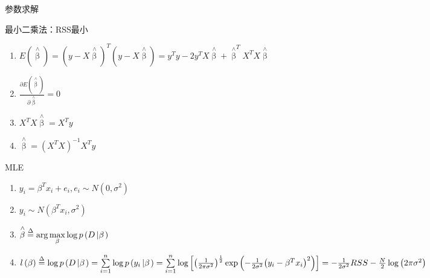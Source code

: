 \documentclass[xetex,mathserif,serif]{beamer}
\begin{document}
\begin{frame}{参数求解}
\begin{block}{最小二乘法：RSS最小}
\begin{enumerate}
  \item $E(\mathop \beta \limits^ \wedge) = {\left( {y  - X\mathop \beta \limits^ \wedge  } \right)^T}\left( {y  - X\mathop \beta \limits^ \wedge  } \right) = y^T y - 2 y^T X \mathop \beta \limits^ \wedge + {\mathop \beta \limits^ \wedge} ^T X ^T X \mathop \beta \limits^ \wedge$
  \item $\frac{{\partial E\left( {\mathop \beta \limits^ \wedge  } \right)}}{{\partial \mathop \beta \limits^ \wedge  }} = 0$
  \item $ X^T X \mathop \beta \limits^ \wedge  = X^T y $
  \item $ \mathop \beta \limits^ \wedge = {\left( {{X^T}X} \right)^{ - 1}}{X^T}y $
\end{enumerate}
\end{block}
\end{frame}

\begin{frame}{MLE}
\begin{enumerate}
  \item ${y_i} = {\beta ^T}{x_i} + {e_i},{e_i} \sim N\left( {0,{\sigma ^2}} \right)$
  \item ${y_i} \sim N\left( {{\beta ^T}{x_i},{\sigma ^2}} \right)$
  \item $\mathop \beta \limits^ \wedge   \buildrel \Delta \over = \arg \mathop {\max }\limits_\beta  \log p\left( {D\left| \beta  \right.} \right)$
 \item $l\left( \beta  \right) \buildrel \Delta \over = \log p\left( {D\left| \beta  \right.} \right)
 = \sum\limits_{i = 1}^n {\log p\left( {{y_i}\left| \beta  \right.} \right)}
 = \sum\limits_{i = 1}^n {\log \left[ {{{\left( {\frac{1}{{2\pi {\sigma ^2}}}} \right)}^{\frac{1}{2}}}\exp \left( { - \frac{1}{{2{\sigma ^2}}}{{\left( {{y_i} - {\beta ^T}{x_i}} \right)}^2}} \right)} \right]}
  =  - \frac{1}{{2{\sigma ^2}}}RSS - \frac{N}{2}\log \left( {2\pi {\sigma ^2}} \right)$
\end{enumerate}
\end{frame}
\end{document}
